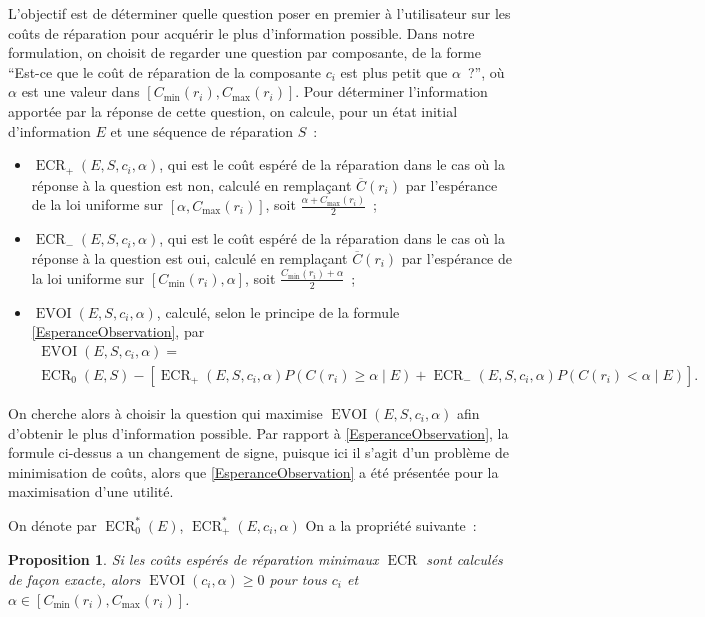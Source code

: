 \documentclass[a4paper,11pt]{article}
\theoremstyle{plain}
\newtheorem*{prop}{Proposition}
\DeclareMathOperator{\ECR}{ECR}
\DeclareMathOperator{\EVOI}{EVOI}
\begin{document}
L'objectif est de déterminer quelle question poser en premier à l'utilisateur sur les coûts de réparation pour acquérir le plus d'information possible. Dans notre formulation, on choisit de regarder une question par composante, de la forme ``Est-ce que le coût de réparation de la composante $c_i$ est plus petit que $\alpha$~?'', où $\alpha$ est une valeur dans $[C_{\min}(r_i), C_{\max}(r_i)]$. Pour déterminer l'information apportée par la réponse de cette question, on calcule, pour un état initial d'information $E$ et une séquence de réparation $S$~:
\begin{itemize}
\item $\ECR_+(E, S, c_i, \alpha)$, qui est le coût espéré de la réparation dans le cas où la réponse à la question est non, calculé en remplaçant $\overline C(r_i)$ par l'espérance de la loi uniforme sur $[\alpha, C_{\max}(r_i)]$, soit $\frac{\alpha + C_{\max}(r_i)}{2}$~;
\item $\ECR_-(E, S, c_i, \alpha)$, qui est le coût espéré de la réparation dans le cas où la réponse à la question est oui, calculé en remplaçant $\overline C(r_i)$ par l'espérance de la loi uniforme sur $[C_{\min}(r_i), \alpha]$, soit $\frac{C_{\min}(r_i) + \alpha}{2}$~;
\item $\EVOI(E, S, c_i, \alpha)$, calculé, selon le principe de la formule \eqref{EsperanceObservation}, par
\begin{multline*}
\EVOI(E, S, c_i, \alpha) = \\ \ECR_0(E, S) - \left[\ECR_+(E, S, c_i, \alpha) P(C(r_i) \geq \alpha \mid E) + \ECR_-(E, S, c_i, \alpha) P(C(r_i) < \alpha \mid E)\right].
\end{multline*}
\end{itemize}
On cherche alors à choisir la question qui maximise $\EVOI(E, S, c_i, \alpha)$ afin d'obtenir le plus d'information possible. Par rapport à \eqref{EsperanceObservation}, la formule ci-dessus a un changement de signe, puisque ici il s'agit d'un problème de minimisation de coûts, alors que \eqref{EsperanceObservation} a été présentée pour la maximisation d'une utilité.

On dénote par $\ECR_0^\ast(E)$, $\ECR_+^\ast(E, c_i, \alpha)$
 On a la propriété suivante~:

\begin{prop}
Si les coûts espérés de réparation minimaux $\ECR$ sont calculés de façon exacte, alors $\EVOI(c_i, \alpha) \geq 0$ pour tous $c_i$ et $\alpha \in [C_{\min}(r_i), C_{\max}(r_i)]$.
\end{prop}
\end{document}
